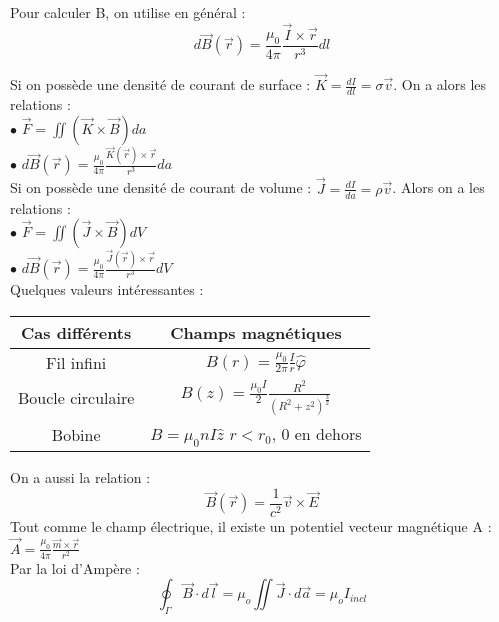 \documentclass[../main.tex]{subfiles}
\begin{document}
Pour calculer B, on utilise en général :\\
\begin{equation}
    d\vec{B}(\vec{r}) = \frac{\mu_0}{4\pi} \frac{\vec{I} \times \vec{r}}{r^3}dl
\end{equation}


Si on possède une densité de courant de surface : $\vec{K} = \frac{dI}{dl} = \sigma \vec{v}$. On a alors les relations :\\
$\bullet$ $\vec{F} = \iint (\vec{K}\times \vec{B})da$\\
$\bullet$ $d\vec{B}(\vec{r}) = \frac{\mu_0}{4\pi} \frac{\vec{K}(\vec{r}) \times \vec{r}}{r^3}da$\\

Si on possède une densité de courant de volume : $\vec{J} = \frac{dI}{da} = \rho \vec{v}$. Alors on a les relations :\\
$\bullet$ $\vec{F} = \iint (\vec{J}\times \vec{B})dV$\\
$\bullet$ $d\vec{B}(\vec{r}) = \frac{\mu_0}{4\pi} \frac{\vec{J}(\vec{r}) \times \vec{r}}{r^3}dV$\\

Quelques valeurs intéressantes :\\
\begin{table}[hbt!]
    \centering
    \begin{tabular}{c|c}
        Cas différents & Champs magnétiques \\
        \hline
        Fil infini & $B(r) = \frac{\mu_0}{2\pi} \frac{I}{r} \hat \varphi$\\
        \hline
        Boucle circulaire & $B(z) = \frac{\mu_0 I}{2} \frac{R^2}{(R^2+z^2)^{\frac{3}{2}}}$\\
        \hline
        Bobine & $B = \mu_0 nI \hat{z}$ $r<r_0$, 0 en  dehors\\        
    \end{tabular}
\end{table}

On a aussi la relation :\\
\begin{equation}
    \vec{B}(\vec{r}) = \frac{1}{c^2} \vec{v}\times \vec{E}
\end{equation}
Tout comme le champ électrique, il existe un potentiel vecteur magnétique A : $\vec{A} = \frac{\mu_0}{4\pi} \frac{\vec{m}\times \vec{r}}{r^2}$\\

Par la loi d'Ampère : \\
\begin{equation}
    \oint_{\Gamma} \vec{B}\cdot d\vec{l} = \mu_o \iint \vec{J}\cdot d\vec{a} = \mu_o I_{incl}
\end{equation}
\end{document}
